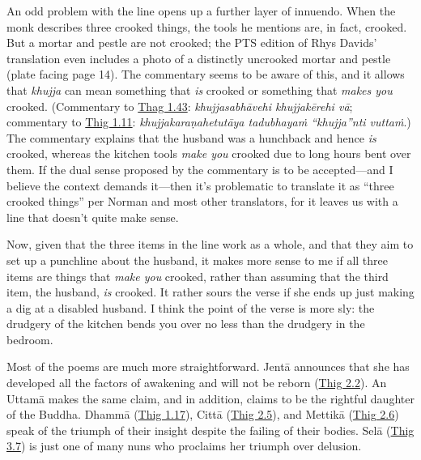 \documentclass[12pt,openany]{book}%
\begin{document}
An odd problem with the line opens up a further layer of innuendo. When the monk describes three crooked things, the tools he mentions are, in fact, crooked. But a mortar and pestle are not crooked; the PTS edition of Rhys Davids’ translation even includes a photo of a distinctly uncrooked mortar and pestle (plate facing page 14). The commentary seems to be aware of this, and it allows that \textit{khujja} can mean something that \emph{is} crooked or something that \emph{makes you} crooked. (Commentary to \href{https://suttacentral.net/thag1.43/en/sujato}{Thag 1.43}: \textit{\textsanskrit{khujjasabhāvehi} khujjakērehi \textsanskrit{vā}}; commentary to \href{https://suttacentral.net/thig1.11}{Thig 1.11}: \textit{\textsanskrit{khujjakaraṇahetutāya} \textsanskrit{tadubhayaṁ} “khujja”nti \textsanskrit{vuttaṁ}}.) The commentary explains that the husband was a hunchback and hence \emph{is} crooked, whereas the kitchen tools \emph{make you} crooked due to long hours bent over them. If the dual sense proposed by the commentary is to be accepted—and I believe the context demands it—then it’s problematic to translate it as “three crooked things” per Norman and most other translators, for it leaves us with a line that doesn’t quite make sense.

Now, given that the three items in the line work as a whole, and that they aim to set up a punchline about the husband, it makes more sense to me if all three items are things that \emph{make you} crooked, rather than assuming that the third item, the husband, \emph{is} crooked. It rather sours the verse if she ends up just making a dig at a disabled husband. I think the point of the verse is more sly: the drudgery of the kitchen bends you over no less than the drudgery in the bedroom.

Most of the poems are much more straightforward. \textsanskrit{Jentā} announces that she has developed all the factors of awakening and will not be reborn (\href{https://suttacentral.net/thig2.2}{Thig 2.2}). An \textsanskrit{Uttamā} makes the same claim, and in addition, claims to be the rightful daughter of the Buddha. \textsanskrit{Dhammā} (\href{https://suttacentral.net/thig1.17}{Thig 1.17}), \textsanskrit{Cittā} (\href{https://suttacentral.net/thig2.5}{Thig 2.5}), and \textsanskrit{Mettikā} (\href{https://suttacentral.net/thig2.6}{Thig 2.6}) speak of the triumph of their insight despite the failing of their bodies. \textsanskrit{Selā} (\href{https://suttacentral.net/thig3.7}{Thig 3.7}) is just one of many nuns who proclaims her triumph over delusion.
\end{document}
